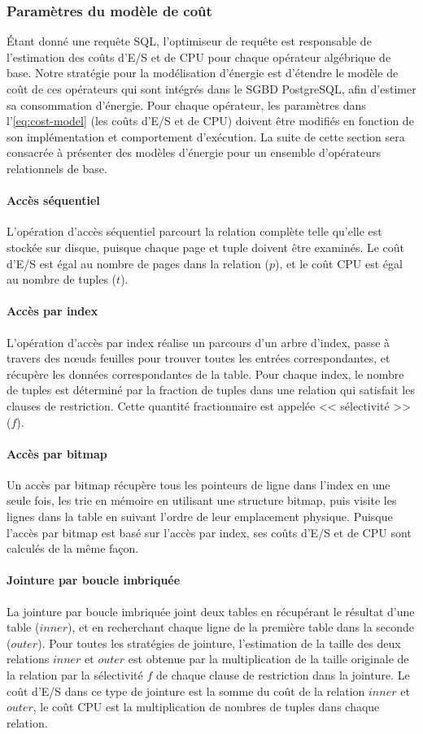 \subsubsection{Paramètres du modèle de coût}\label{sec:cost-model-param}
Étant donné une requête SQL, l'optimiseur de requête est responsable de l'estimation des coûts d'E/S et de CPU pour chaque opérateur algébrique de base. Notre stratégie pour la modélisation d'énergie est d'étendre le modèle de coût de ces opérateurs qui sont intégrés dans le SGBD PostgreSQL, afin d'estimer sa consommation d'énergie.
Pour chaque opérateur, les paramètres dans l'\ref{eq:cost-model} (les coûts d'E/S et de CPU) doivent être modifiés en fonction de son implémentation et comportement d'exécution. La suite de cette section sera consacrée à présenter des modèles d'énergie pour un ensemble d'opérateurs relationnels de base.

\paragraph{Accès séquentiel} L'opération d'accès séquentiel parcourt la relation complète telle qu’elle est stockée sur disque, puisque chaque page et tuple doivent être examinés. Le coût d'E/S est égal au nombre de pages dans la relation ($p$), et le coût CPU est égal au nombre de tuples ($t$).
\paragraph{Accès par index} L'opération d'accès par index réalise un parcours d'un arbre d'index, passe à travers des nœuds feuilles pour trouver toutes les entrées correspondantes, et récupère les données correspondantes de la table. Pour chaque index, le nombre de tuples est déterminé par la fraction de tuples dans une relation qui satisfait les clauses de restriction. Cette quantité fractionnaire est appelée << sélectivité >> ($f$).
\paragraph{Accès par bitmap} Un accès par bitmap récupère tous les pointeurs de ligne dans l’index en une seule fois, les trie en mémoire en utilisant une structure bitmap, puis visite les lignes dans la table en suivant l’ordre de leur emplacement physique. Puisque l'accès par bitmap est basé sur l'accès par index, ses coûts d'E/S et de CPU sont calculés de la même façon.
\paragraph{Jointure par boucle imbriquée} La jointure par boucle imbriquée joint deux tables en récupérant le résultat d’une table ($inner$), et en recherchant chaque ligne de la première table dans la seconde ($outer$). Pour toutes les stratégies de jointure, l'estimation de la taille des deux relations $inner$ et $outer$ est obtenue par la multiplication de la taille originale de la relation par la sélectivité $f$ de chaque clause de restriction dans la jointure. Le coût d'E/S dans ce type de jointure est la somme du coût de la relation $inner$ et $outer$, le coût CPU est la multiplication de nombres de tuples dans chaque relation.
